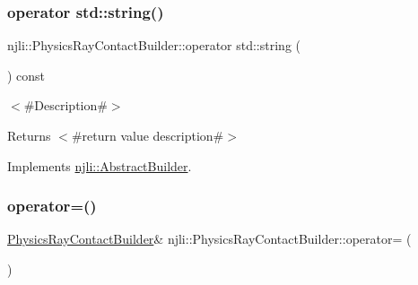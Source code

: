 \subsubsection{\texorpdfstring{operator std\+::string()}{operator std::string()}}
{\footnotesize\ttfamily njli\+::\+Physics\+Ray\+Contact\+Builder\+::operator std\+::string (\begin{DoxyParamCaption}{ }\end{DoxyParamCaption}) const\hspace{0.3cm}{\ttfamily [virtual]}}

$<$\#\+Description\#$>$

\begin{DoxyReturn}{Returns}
$<$\#return value description\#$>$ 
\end{DoxyReturn}


Implements \mbox{\hyperlink{classnjli_1_1_abstract_builder_a3e6e553e06d1ca30517ad5fb0bd4d000}{njli\+::\+Abstract\+Builder}}.

\mbox{\label{classnjli_1_1_physics_ray_contact_builder_acc899f63fafc4de380b1f3b829d3babe}} 
\subsubsection{\texorpdfstring{operator=()}{operator=()}}
{\footnotesize\ttfamily \mbox{\hyperlink{classnjli_1_1_physics_ray_contact_builder}{Physics\+Ray\+Contact\+Builder}}\& njli\+::\+Physics\+Ray\+Contact\+Builder\+::operator= (\begin{DoxyParamCaption}\item[{const \mbox{\hyperlink{classnjli_1_1_physics_ray_contact_builder}{Physics\+Ray\+Contact\+Builder}} \&}]{ }\end{DoxyParamCaption})\hspace{0.3cm}{\ttfamily [protected]}}

\mbox{\label{classnjli_1_1_physics_ray_contact_builder_af11d9c73fa7c074c62fa2e5e01f368d4}} 
